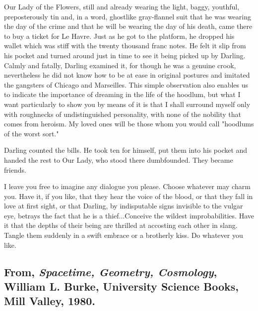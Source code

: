 \documentclass[
]{memoir}
\newlength{\drop}%
\begin{document}
Our Lady of the Flowers, still and already wearing the light, baggy,
youthful, preposterously tin and, in a word, ghostlike gray-flannel suit
that he was wearing the day of the crime and that he will be wearing the
day of his death, came there to buy a ticket for Le Havre. Just as he
got to the platform, he dropped his wallet which was stiff with the
twenty thousand franc notes. He felt it slip from his pocket and turned
around just in time to see it being picked up by Darling. Calmly and
fatally, Darling examined it, for though he was a genuine crook,
nevertheless he did not know how to be at ease in original postures and
imitated the gangsters of Chicago and Marseilles. This simple
observation also enables us to indicate the importance of dreaming in
the life of the hoodlum, but what I want particularly to show you by
means of it is that I shall surround myself only with roughnecks of
undistinguished personality, with none of the nobility that comes from
heroism. My loved ones will be those whom you would call "hoodlums of
the worst sort."

Darling counted the bills. He took ten for himself, put them into his
pocket and handed the rest to Our Lady, who stood there dumbfounded.
They became friends.

I leave you free to imagine any dialogue you please. Choose whatever may
charm you. Have it, if you like, that they hear the voice of the blood,
or that they fall in love at first sight, or that Darling, by
indisputable signs invisible to the vulgar eye, betrays the fact that he
is a thief...Conceive the wildest improbabilities. Have it that the
depths of their being are thrilled at accosting each other in slang.
Tangle them suddenly in a swift embrace or a brotherly kiss. Do whatever
you like.

\hypertarget{from-spacetime-geometry-cosmology-william-l.-burke-university-science-books-mill-valley-1980.}{%
\subsection*{\texorpdfstring{From, \emph{Spacetime, Geometry,
Cosmology}, William L. Burke, University Science Books, Mill Valley,
1980.}{From, Spacetime, Geometry, Cosmology, William L. Burke, University Science Books, Mill Valley, 1980.}}\label{from-spacetime-geometry-cosmology-william-l.-burke-university-science-books-mill-valley-1980.}}
\end{document}
